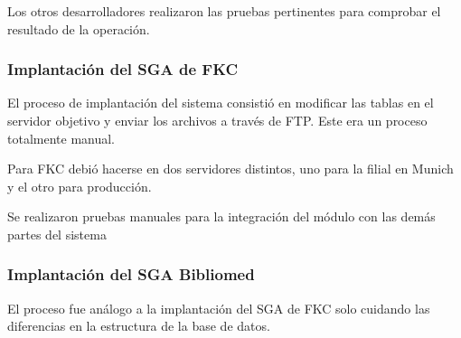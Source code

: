 Los otros desarrolladores realizaron las pruebas pertinentes para comprobar el resultado de la operación.

\subsubsection{Implantación del SGA de FKC}

El proceso de implantación del sistema consistió en modificar las tablas en el servidor objetivo y enviar los archivos a través de FTP. Este era un proceso totalmente manual.

Para FKC debió hacerse en dos servidores distintos, uno para la filial en Munich y el otro para producción.

Se realizaron pruebas manuales para la integración del módulo con las demás partes del sistema

\subsubsection{Implantación del SGA Bibliomed}

El proceso fue análogo a la implantación del SGA de FKC solo cuidando las diferencias en la estructura de la base de datos.



